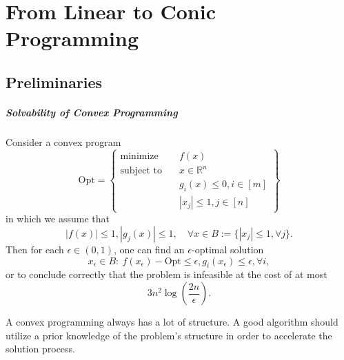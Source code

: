 \chapter{From Linear to Conic Programming}

\section{Preliminaries}
\paragraph{Solvability of Convex Programming}
\begin{theorem}
Consider a convex program
\[
\mbox{Opt}=
\left\{
\begin{array}{ll}
\mbox{minimize}&\quad f(x)\\
\mbox{subject to}&\quad x\in\mathbb{R}^n\\
&\quad g_i(x)\le0, i\in[m]\\
&\quad |x_j|\le1, j\in[n]
\end{array}
\right\}
\]
in which we assume that 
\[
|f(x)|\le 1, |g_j(x)|\le 1,\quad\forall x\in B:=\{|x_j|\le1 ,\forall j\}.
\]
Then for each $\epsilon\in(0,1)$, one can find an $\epsilon$-optimal solution 
\[
x_{\epsilon}\in B:~f(x_{\epsilon}) - \text{Opt} \le \epsilon, 
g_i(x_{\epsilon})\le\epsilon, \forall i,
\]
or to conclude correctly that the problem is infeasible at the cost of at most
\[
3n^2\log\left(
\frac{2n}{\epsilon}
\right).
\]
\end{theorem}
A convex programming always has a lot of structure.
A good algorithm should utilize a prior knowledge of the problem's structure in order to 
accelerate the solution process.


